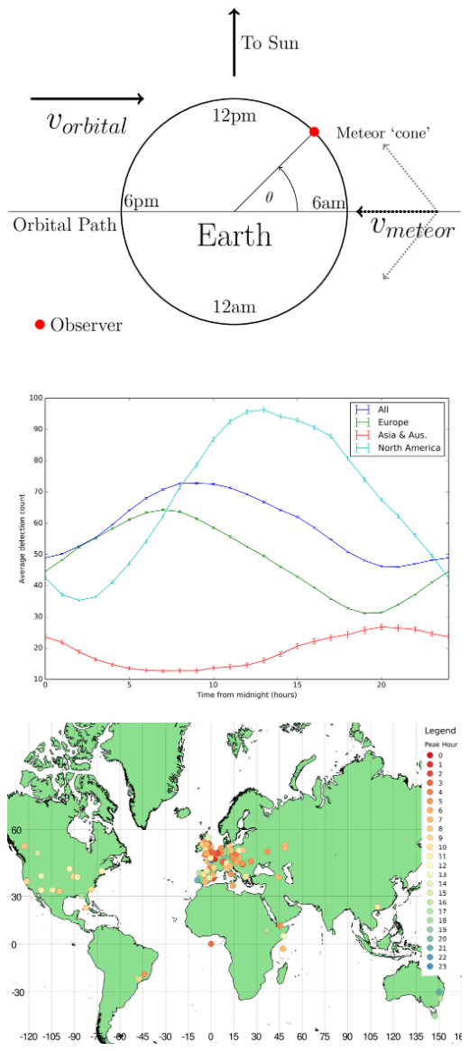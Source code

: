 \documentclass{beamer}
\begin{document}
	\begin{frame}
		\centering
		\includegraphics[width=\linewidth]{diagram}
	\end{frame}
	
	\begin{frame}
		\centering
		\includegraphics[width=\linewidth]{all_shifts}
	\end{frame}

	\begin{frame}
		\centering
		\includegraphics[width=\linewidth]{peak_qgis}
	\end{frame}
	
\end{document}
